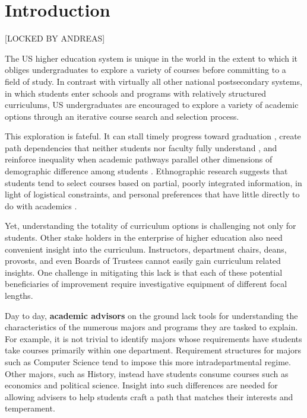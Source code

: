 \section{Introduction}
{\color{red}[LOCKED BY ANDREAS]}



The US higher education system is unique in the world in the extent to
which it obliges undergraduates to explore a variety of courses before
committing to a field of study. In contrast with virtually all other
national postsecondary systems, in which students enter schools and
programs with relatively structured curriculums, US undergraduates are
encouraged to explore a variety of academic options through an
iterative course search and selection process.


This exploration is fateful. It can stall timely progress toward
graduation \cite{bailey2015redesigning}, create path dependencies that
neither students nor faculty fully understand
\cite{chambliss2014college}, and reinforce inequality when academic
pathways parallel other dimensions of demographic difference among
students \cite{armstrong2013paying}. Ethnographic research suggests
that students tend to select courses based on partial, poorly
integrated information, in light of logistical constraints, and
personal preferences that have little directly to do with academics
\cite{nathan2006my,rosenbaum2011complexities, rosenbaum2007after}.

Yet, understanding the totality of curriculum options is challenging
not only for students. Other stake holders in the enterprise of higher
education also need convenient insight into the
curriculum. Instructors, department chairs, deans, provosts, and
even Boards of Trustees cannot easily gain curriculum related
insights. One challenge in mitigating this lack is that each of these
potential beneficiaries of improvement require investigative equipment
of different focal lengths. 

Day to day, {\bf academic advisors} on the ground lack tools for
understanding the characteristics of the numerous majors and programs
they are tasked to explain. For example, it is not trivial to identify
majors whose requirements have students take courses primarily within
one department. Requirement structures for majors such as Computer
Science tend to impose this more intradepartmental regime. Other
majors, such as History, instead have students consume courses such as
economics and political science. Insight into such differences are
needed for allowing advisers to help students craft a path that
matches their interests and temperament.

